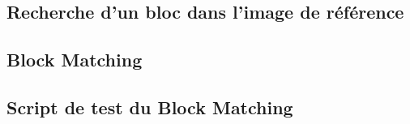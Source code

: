 \documentclass[a4paper, 12pt]{article}
\newcommand{\FSource}[1]{%

}
\begin{document}
\FSource{../search_window.m}

\newpage

\subsection{Recherche d'un bloc dans l'image de référence}\label{block_search}

\FSource{../block_matching.m}

\newpage

\subsection{Block Matching}\label{block_matching}

\FSource{../block_matching_encode.m}

\newpage

\subsection{Script de test du Block Matching}\label{block_matching_test}

\FSource{../block_matching_test.m}
\end{document}

